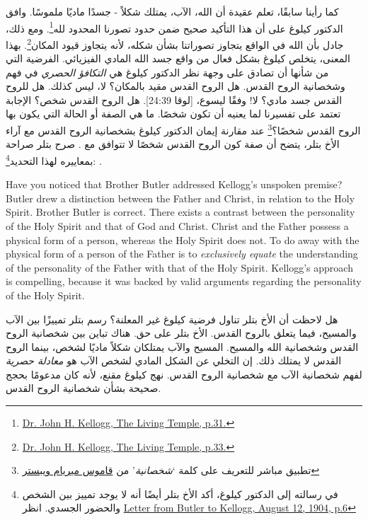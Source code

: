 كما رأينا سابقًا، تعلم عقيدة  أن الله، الآب، يمتلك شكلاً - جسدًا ماديًا ملموسًا. وافق الدكتور كيلوغ على أن هذا التأكيد صحيح ضمن حدود تصورنا المحدود لله\footnote{\href{https://archive.org/details/J.H.Kellogg.TheLivingTemple1903/page/n33/}{Dr. John H. Kellogg, The Living Temple, p.31.}}. ومع ذلك، جادل بأن الله في الواقع يتجاوز تصوراتنا بشأن شكله، لأنه يتجاوز قيود المكان\footnote{\href{https://archive.org/details/J.H.Kellogg.TheLivingTemple1903/page/n33/}{Dr. John H. Kellogg, The Living Temple, p.33.}}. بهذا المعنى، يتخلص كيلوغ بشكل فعال من واقع جسد الله المادي الفيزيائي. الفرضية التي من شأنها أن تصادق على وجهة نظر الدكتور كيلوغ هي \textit{التكافؤ الحصري} في فهم  وشخصانية الروح القدس. هل الروح القدس مقيد بالمكان؟ لا، ليس كذلك. هل للروح القدس جسد مادي؟ لا! وفقًا ليسوع، [لوقا 24:39]. هل الروح القدس شخص؟ الإجابة تعتمد على تفسيرنا لما يعنيه أن تكون شخصًا. ما هي الصفة أو الحالة التي يكون بها الروح القدس شخصًا؟\footnote{تطبيق مباشر للتعريف على كلمة ‘\textit{شخصانية}’ من \href{https://www.merriam-webster.com/dictionary/personality}{قاموس ميريام ويبستر}} عند مقارنة إيمان الدكتور كيلوغ بشخصانية الروح القدس مع آراء الأخ بتلر، يتضح أن صفة كون الروح القدس شخصًا لا تتوافق مع . صرح بتلر صراحة بمعاييره لهذا التحديد\footnote{في رسالته إلى الدكتور كيلوغ، أكد الأخ بتلر أيضًا أنه لا يوجد تمييز بين الشخص والحضور الجسدي. انظر \href{https://c7da.us/egwdl/Butler\%20to\%20Kellogg\%20Aug121904.pdf}{Letter from Butler to Kellogg, August 12, 1904, p.6}}: .


Have you noticed that Brother Butler addressed Kellogg’s unspoken premise? Butler drew a distinction between the Father and Christ, in relation to the Holy Spirit. Brother Butler is correct. There exists a contrast between the personality of the Holy Spirit and that of God and Christ. Christ and the Father possess a physical form of a person, whereas the Holy Spirit does not. To do away with the physical form of a person of the Father is to \textit{exclusively equate} the understanding of the personality of the Father with that of the Holy Spirit. Kellogg’s approach is compelling, because it was backed by valid arguments regarding the personality of the Holy Spirit.


هل لاحظت أن الأخ بتلر تناول فرضية كيلوغ غير المعلنة؟ رسم بتلر تمييزًا بين الآب والمسيح، فيما يتعلق بالروح القدس. الأخ بتلر على حق. هناك تباين بين شخصانية الروح القدس وشخصانية الله والمسيح. المسيح والآب يمتلكان شكلاً ماديًا لشخص، بينما الروح القدس لا يمتلك ذلك. إن التخلي عن الشكل المادي لشخص الآب هو \textit{معادلة حصرية} لفهم شخصانية الآب مع شخصانية الروح القدس. نهج كيلوغ مقنع، لأنه كان مدعومًا بحجج صحيحة بشأن شخصانية الروح القدس.


